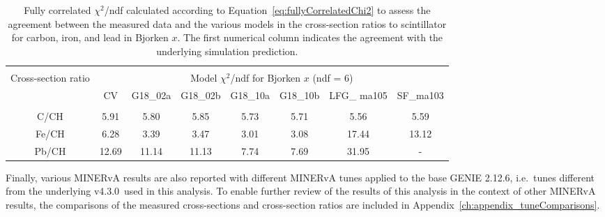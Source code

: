 \begin{table}[t!]
    \centering
    \begin{adjustbox}{width=1.01\textwidth,center=\textwidth}
    \begin{tabular}{c c c c c c c c}
    \hline \\ [-1.5 ex]
    \multirow[c]{2}{*}{Cross-section ratio} & \multicolumn{7}{c}{Model $\chi^2$/ndf for Bjorken $x$ (ndf = 6) } \\ [0.8ex]
     & CV & G18\_02a & G18\_02b & G18\_10a & G18\_10b & LFG\_ ma105 & SF\_ma103\\ [0.5ex] %
    \hline
    \hline \\[-1.9ex]
    C/CH & 5.91 & 5.80 & 5.85 & 5.73 & 5.71 & 5.56 & 5.59 \\
    Fe/CH & 6.28 & 3.39 & 3.47 & 3.01 & 3.08 & 17.44 & 13.12 \\
    Pb/CH & 12.69 & 11.14 & 11.13 & 7.74 & 7.69 & 31.95 & - \\
    \hline
    \end{tabular}    
    \end{adjustbox}
    \caption{Fully correlated $\chi^2$/ndf calculated according to Equation~\ref{eq:fullyCorrelatedChi2} to assess the agreement between the measured data and the various models in the cross-section ratios to scintillator for carbon, iron, and lead in Bjorken $x$. The first numerical column indicates the agreement with the underlying simulation prediction.}
    \label{table:xsecRatio_modelComparison_x}
\end{table}

Finally, various MINERvA results are also reported with different MINERvA tunes applied to the base GENIE 2.12.6, i.e.~tunes different from the underlying v4.3.0~used in this analysis. To enable further review of the results of this analysis in the context of other MINERvA results, the comparisons of the measured cross-sections and cross-section ratios are included in Appendix~\ref{ch:appendix_tuneComparisons}. 




